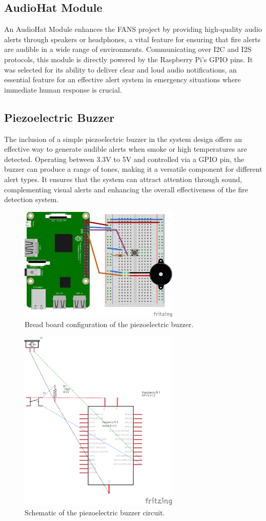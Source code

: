 \subsection{AudioHat Module}


An AudioHat Module enhances the FANS project by providing high-quality audio alerts through speakers or headphones, a
vital feature for ensuring that fire alerts are audible in a wide range of environments. Communicating over I2C and I2S
protocols, this module is directly powered by the Raspberry Pi's GPIO pins. It was selected for its ability to deliver
clear and loud audio notifications, an essential feature for an effective alert system in emergency situations where
immediate human response is crucial.

\subsection{Piezoelectric Buzzer}

The inclusion of a simple piezoelectric buzzer in the system design offers an effective way to generate audible alerts
when smoke or high temperatures are detected. Operating between 3.3V to 5V and controlled via a GPIO pin, the buzzer
can produce a range of tones, making it a versatile component for different alert types. It ensures that the system can
attract attention through sound, complementing visual alerts and enhancing the overall effectiveness of the fire
detection system.

\begin{figure}[H]
    \centering
    \includegraphics[width=3in]{../assets/BuzzerBB.png}
    \caption{Bread board configuration of the piezoelectric buzzer.}
\end{figure}

\begin{figure}[H]
    \centering
    \includegraphics[width=3in]{../assets/BuzzerSchema.png}
    \caption{Schematic of the piezoelectric buzzer circuit.}
\end{figure}
